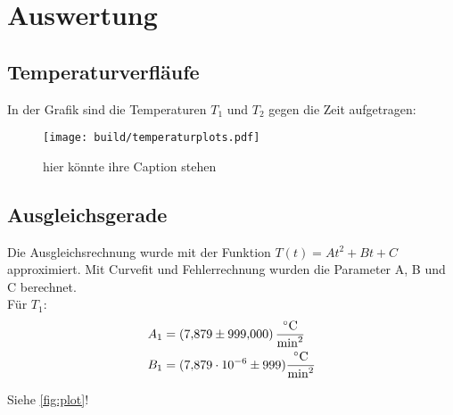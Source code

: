 \section{Auswertung}
\label{sec:Auswertung}


\subsection{Temperaturverfläufe}
In der Grafik sind die Temperaturen $T_1$ und $T_2$ gegen die Zeit aufgetragen:
\begin{figure}
  \centering
  \texttt{[image: build/temperaturplots.pdf]}
  \caption{hier könnte ihre Caption stehen}
\end{figure}

\subsection{Ausgleichsgerade}
Die Ausgleichsrechnung wurde mit der Funktion $T(t) = A t^2 + B t + C$ approximiert. Mit Curvefit und Fehlerrechnung 
wurden die Parameter A, B und C berechnet.\\
Für $T_1$:
\begin{align}
  A_1 &= \SI{7.879 \pm 999}{\degreeCelsius\per\square\minute}\\
  B_1 &= (\num{7.879e-06} \pm 999) \si{\degreeCelsius\per\square\minute}
\end{align}


Siehe \autoref{fig:plot}!
